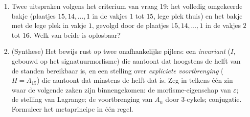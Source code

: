 \begin{problem}
\begin{enumerate}[resume]
        cyclische volgorde van de plaatjes invariant is, dat elke
        bereikbaarheidsklasse precies $n(n - 1)$ standen telt
        \emph{(de klassen zijn de banen van een 
        van  $\operatorname{lcm}(n, n-1) = n(n-1)$)}, en dat
        er $(n - 2)!$ klassen zijn --- voor $n \geq 5$ veel meer
        dan $2$: op een smal bord vangt de pariteitsinvariant
        vrijwel niets, en heerst de meetkunde.
  \item Twee uitspraken volgens het criterium van vraag 19: het
        volledig omgekeerde bakje (plaatjes $15, 14, \dots, 1$ in
        de vakjes $1$ tot $15$, lege plek thuis) en het bakje met
        de lege plek in vakje $1$, gevolgd door de plaatjes $15,
        14, \dots, 1$ in de vakjes $2$ tot $16$. Welk van beide is
        oplosbaar?
  \item (Synthese) Het bewijs rust op twee onafhankelijke pijlers:
        een \emph{invariant} ($I$, gebouwd op het
        signatuurmorfisme) die aantoont dat hoogstens de helft van
        de standen bereikbaar is, en een stelling over
        \emph{expliciete voortbrenging} ($H = A_{15}$) die
        aantoont dat minstens de helft dat is. Zeg in telkens één
        zin waar de volgende zaken zijn binnengekomen: de
        morfisme-eigenschap van $\varepsilon$; de stelling van
        Lagrange; de voortbrenging van $A_n$ door $3$-cykels;
        conjugatie. Formuleer het metaprincipe in één regel.
\end{enumerate}
\end{problem}
